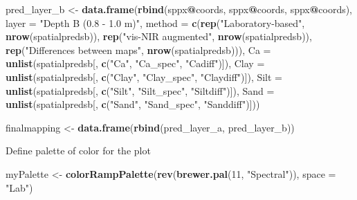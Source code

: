 \documentclass[]{book}
\newenvironment{Shaded}{\begin{snugshade}}{\end{snugshade}}
\newcommand{\DataTypeTok}[1]{\textcolor[rgb]{0.13,0.29,0.53}{#1}}
\newcommand{\DecValTok}[1]{\textcolor[rgb]{0.00,0.00,0.81}{#1}}
\newcommand{\KeywordTok}[1]{\textcolor[rgb]{0.13,0.29,0.53}{\textbf{#1}}}
\newcommand{\NormalTok}[1]{#1}
\newcommand{\OperatorTok}[1]{\textcolor[rgb]{0.81,0.36,0.00}{\textbf{#1}}}
\newcommand{\StringTok}[1]{\textcolor[rgb]{0.31,0.60,0.02}{#1}}
\begin{document}
\begin{Shaded}
\begin{Highlighting}[]
\NormalTok{pred_layer_b <-}\StringTok{ }\KeywordTok{data.frame}\NormalTok{(}\KeywordTok{rbind}\NormalTok{(sppx}\OperatorTok{@}\NormalTok{coords, sppx}\OperatorTok{@}\NormalTok{coords, sppx}\OperatorTok{@}\NormalTok{coords), }\DataTypeTok{layer =} \StringTok{"Depth B (0.8 - 1.0 m)"}\NormalTok{, }
                    \DataTypeTok{method =} \KeywordTok{c}\NormalTok{(}\KeywordTok{rep}\NormalTok{(}\StringTok{"Laboratory-based"}\NormalTok{, }\KeywordTok{nrow}\NormalTok{(spatialpredsb)), }\KeywordTok{rep}\NormalTok{(}\StringTok{"vis-NIR augmented"}\NormalTok{, }
                                        \KeywordTok{nrow}\NormalTok{(spatialpredsb)), }\KeywordTok{rep}\NormalTok{(}\StringTok{"Differences between maps"}\NormalTok{, }\KeywordTok{nrow}\NormalTok{(spatialpredsb))), }
                    \DataTypeTok{Ca =} \KeywordTok{unlist}\NormalTok{(spatialpredsb[, }\KeywordTok{c}\NormalTok{(}\StringTok{"Ca"}\NormalTok{, }\StringTok{"Ca_spec"}\NormalTok{, }\StringTok{"Cadiff"}\NormalTok{)]), }\DataTypeTok{Clay =} \KeywordTok{unlist}\NormalTok{(spatialpredsb[, }
                                        \KeywordTok{c}\NormalTok{(}\StringTok{"Clay"}\NormalTok{, }\StringTok{"Clay_spec"}\NormalTok{, }\StringTok{"Claydiff"}\NormalTok{)]), }\DataTypeTok{Silt =} \KeywordTok{unlist}\NormalTok{(spatialpredsb[, }
                                        \KeywordTok{c}\NormalTok{(}\StringTok{"Silt"}\NormalTok{, }\StringTok{"Silt_spec"}\NormalTok{, }\StringTok{"Siltdiff"}\NormalTok{)]), }\DataTypeTok{Sand =} \KeywordTok{unlist}\NormalTok{(spatialpredsb[, }
                                        \KeywordTok{c}\NormalTok{(}\StringTok{"Sand"}\NormalTok{, }\StringTok{"Sand_spec"}\NormalTok{, }\StringTok{"Sanddiff"}\NormalTok{)]))}

\NormalTok{finalmapping <-}\StringTok{ }\KeywordTok{data.frame}\NormalTok{(}\KeywordTok{rbind}\NormalTok{(pred_layer_a, pred_layer_b))}
\end{Highlighting}
\end{Shaded}

Define palette of color for the plot

\begin{Shaded}
\begin{Highlighting}[]
\NormalTok{myPalette <-}\StringTok{ }\KeywordTok{colorRampPalette}\NormalTok{(}\KeywordTok{rev}\NormalTok{(}\KeywordTok{brewer.pal}\NormalTok{(}\DecValTok{11}\NormalTok{, }\StringTok{"Spectral"}\NormalTok{)), }\DataTypeTok{space =} \StringTok{"Lab"}\NormalTok{)}
\end{Highlighting}
\end{Shaded}
\end{document}
